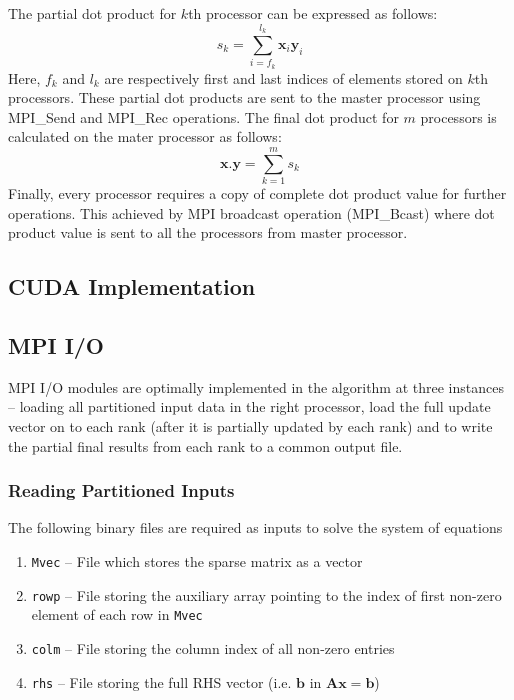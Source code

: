 \documentclass[sigplan,screen]{acmart}
\begin{document}
 The partial dot product for $k$th processor can be expressed as follows:
\begin{equation}
s_k =\sum_{i=f_k}^{l_k}\textbf{x}_i\textbf{y}_i
\end{equation}
Here, $f_k$ and $l_k$ are respectively first and last indices of elements stored on $k$th processors. These partial dot products are  sent to the master processor using MPI\_Send and MPI\_Rec operations. The final dot product for $m$ processors is calculated on the mater processor as follows:
\begin{equation}
\textbf{x}.\textbf{y}= \sum_{k=1}^{m}s_k
\end{equation}
Finally, every processor requires a copy of complete dot product value for further operations. This achieved by MPI broadcast operation (MPI\_Bcast) where dot product value is sent to all the processors from master processor.

\subsection{CUDA Implementation}
\subsection{MPI I/O}
MPI I/O modules are optimally implemented in the algorithm at three instances -- loading all partitioned input data in the right processor, load the full update vector on to each rank (after it is partially updated by each rank) and to write the partial final results from each rank to a common output file.

\subsubsection{Reading Partitioned Inputs}
The following binary files are required as inputs to solve the system of equations
\begin{enumerate}
	\item \texttt{Mvec} -- File which stores the sparse matrix as a vector
	\item \texttt{rowp} -- File storing the auxiliary array pointing to the index of first non-zero element of each row in \texttt{Mvec}
	\item \texttt{colm} -- File storing the column index of all non-zero entries
	\item \texttt{rhs} -- File storing the full RHS vector (i.e. $\mathbf{b}$ in $\mathbf{A}\mathbf{x}=\mathbf{b}$)
\end{enumerate} 
\end{document}
